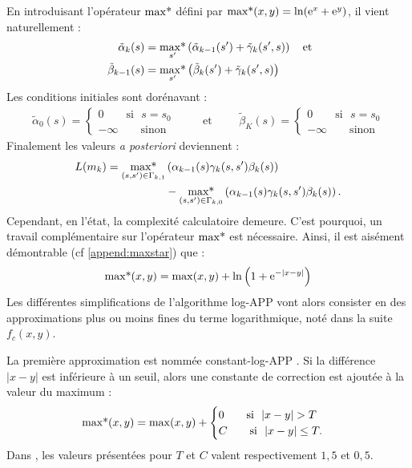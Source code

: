 En introduisant l'opérateur  $\operatorname*{max*}$ défini par $\operatorname*{max*}(x,y) = \ln(\mathrm{e}^x+ \mathrm{e}^y)$, il vient naturellement :
\begin{align*}
	~\tilde{\alpha}_k(s)    & = \operatorname*{max*}\limits_{s'}\left(\tilde{\alpha}_{k-1}(s') + \tilde{\gamma}_k(s', s)\right) 
	\quad\text{et} \\
	~\tilde{\beta}_{k-1}(s) & = \operatorname*{max*}\limits_{s'} \left(\tilde{\beta}_{k}(s') + \tilde{\gamma}_k(s', s)\right)   
\end{align*}
Les conditions initiales sont dorénavant : 
\[
	\begin{split}
		\tilde{\alpha}_0(s)=\begin{cases}
		0 \qquad\text{si~~} s = s_0 \\
		-\infty \qquad\text{sinon}
		\end{cases}
	\end{split}\qquad\text{et}\qquad
	\begin{split}
		\tilde{\beta}_K(s)=\begin{cases}
		0 \qquad\text{si~~} s = s_0 \\
		-\infty \qquad\text{sinon}
		\end{cases}
	\end{split}
\]
Finalement les valeurs \textit{a posteriori} deviennent : 
\begin{align}
	L(m_k) 	= \operatorname*{max*}\limits_{(s,s')\in\Gamma_{k,1}} & \left(\alpha_{k-1}(s) \gamma_k(s,s') \beta_k(s)\right) \notag \\&- \operatorname*{max*}\limits_{(s,s')\in\Gamma_{k,0}}\left(\alpha_{k-1}(s) \gamma_k(s,s') \beta_k(s)\right).				
\end{align}
Cependant, en l'état, la complexité calculatoire demeure. C'est pourquoi, un travail complémentaire sur l'opérateur $\operatorname*{max*}$ est nécessaire. Ainsi, il est aisément démontrable (cf \ref{append:maxstar}) que : 
\[\operatorname*{max*}(x,y)=\max(x,y) +\ln\left(1+\mathrm{e}^{-|x-y|}\right) \]
Les différentes simplifications de l'algorithme log-APP vont alors consister en des approximations plus ou moins fines du terme logarithmique, noté dans la suite $f_c(x,y)$.

La première approximation est nommée constant-log-APP \cite{constantlog1}. Si la différence $|x-y|$ est inférieure à un seuil, alors une constante de correction est ajoutée à la valeur du maximum : 
\begin{equation}
	\operatorname*{max*}(x,y)=\max(x,y) + \begin{cases} 0 \qquad\text{si~~} |x-y| > T \\
	C \qquad\text{si~~} |x-y| \leq T. \end{cases}
\end{equation}
Dans \cite{constantlog2}, les valeurs présentées pour $T$ et $C$ valent respectivement $1,5$ et $0,5$.

